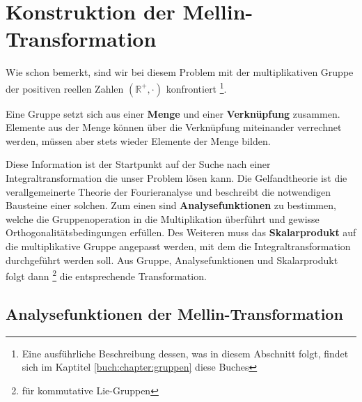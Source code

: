 %
%
%

\section{Konstruktion der Mellin-Transformation
\label{mellin:section:teil2}}
Wie schon bemerkt, sind wir bei diesem Problem mit der multiplikativen Gruppe der positiven reellen Zahlen $(\mathbb{R^+},\cdot)$ 
konfrontiert \footnote{Eine ausführliche Beschreibung dessen, was in diesem Abschnitt folgt, findet sich im Kaptitel 
\ref{buch:chapter:gruppen} diese Buches}.
\begin{definition}
    Eine Gruppe setzt sich aus einer \textbf{Menge} und einer \textbf{Verknüpfung} zusammen. Elemente aus der Menge können über die 
    Verknüpfung miteinander verrechnet werden, müssen aber stets wieder Elemente der Menge bilden.
\end{definition}
Diese Information ist der Startpunkt auf der Suche nach einer Integraltransformation die unser Problem lösen kann.
Die Gelfandtheorie ist die verallgemeinerte Theorie der Fourieranalyse und beschreibt die notwendigen Bausteine einer solchen.
Zum einen sind \textbf{Analysefunktionen} zu bestimmen, welche die Gruppenoperation in die Multiplikation überführt und gewisse 
Orthogonalitätsbedingungen erfüllen. 
Des Weiteren muss das \textbf{Skalarprodukt} auf die multiplikative Gruppe angepasst werden, mit dem die Integraltransformation durchgeführt 
werden soll.
Aus Gruppe, Analysefunktionen und Skalarprodukt folgt dann \footnote{für kommutative Lie-Gruppen} die entsprechende Transformation.






\subsection{Analysefunktionen der Mellin-Transformation
\label{mellin:subsection:analysefunktionen}}

